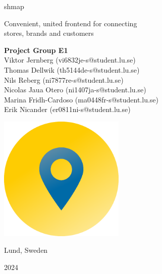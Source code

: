 \documentclass[titlepage]{article}
\def\companyName{shmap}
\begin{document}
\begin{titlepage}
    \begin{center}
        \vspace*{1.5cm}

        {\selectfont
            {\Huge \companyName}
        }

        \vspace{0.5cm}
            {\large Convenient, united frontend for connecting\\
        stores, brands and customers}
            
        \vspace{1.25cm}

        \textbf{Project Group E1} \\
        {\normalsize Viktor Jernberg (vi6832je-s@student.lu.se)\\Thomas Dellwik (th5144de-s@student.lu.se)\\Nils Reberg (ni7877re-s@student.lu.se)\\Nicolas Jaua Otero (ni1407ja-s@student.lu.se)\\Marina Fridh-Cardoso (ma0448fr-s@student.lu.se)\\Erik Nicander (er0811ni-s@student.lu.se)}

        \vspace{1.25cm}

        \includegraphics[width=0.45\textwidth]{logo_gradient.png}
       
        \vspace{1.5cm}

        {\Large Lund, Sweden}

        \vspace{0.5cm}
        
        {\Large 2024}\\
            
    \end{center}
\end{titlepage}
\end{document}
